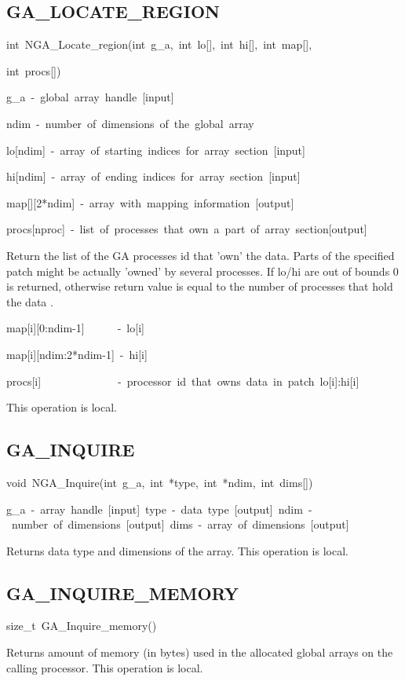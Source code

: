 \subsection*{\label{sub:GA_LOCATE_REGION}GA\_LOCATE\_REGION}
\begin{lyxcode}
int~NGA\_Locate\_region(int~g\_a,~int~lo{[}{]},~int~hi{[}{]},~int~map{[}{]},~

int~procs{[}{]})



g\_a~-~global~array~handle~{[}input{]}~

ndim~-~number~of~dimensions~of~the~global~array

lo{[}ndim{]}~-~array~of~starting~indices~for~array~section~{[}input{]}

hi{[}ndim{]}~-~array~of~ending~indices~for~array~section~{[}input{]}~

map{[}{]}{[}2{*}ndim{]}~-~array~with~mapping~information~{[}output{]}

procs{[}nproc{]}~-~list~of~processes~that~own~a~part~of~array~section{[}output{]}
\end{lyxcode}
Return the list of the GA processes id that 'own' the data. Parts
of the specified patch might be actually 'owned' by several processes.
If lo/hi are out of bounds \textquotedbl{}0\textquotedbl{} is returned,
otherwise return value is equal to the number of processes that hold
the data .
\begin{lyxcode}
map{[}i{]}{[}0:ndim-1{]}~~~~~~-~lo{[}i{]}~

map{[}i{]}{[}ndim:2{*}ndim-1{]}~-~hi{[}i{]}

procs{[}i{]}~~~~~~~~~~~~~~-~processor~id~that~owns~data~in~patch~lo{[}i{]}:hi{[}i{]}
\end{lyxcode}
This operation is local. 


\subsection*{\label{sub:GA_INQUIRE}GA\_INQUIRE}
\begin{lyxcode}
void~NGA\_Inquire(int~g\_a,~int~{*}type,~int~{*}ndim,~int~dims{[}{]})



g\_a~-~array~handle~{[}input{]}~type~-~data~type~{[}output{]}~ndim~-~number~of~dimensions~{[}output{]}~dims~-~array~of~dimensions~{[}output{]}
\end{lyxcode}
Returns data type and dimensions of the array. This operation is local. 


\subsection*{\label{sub:GA_INQUIRE_MEMORY}GA\_INQUIRE\_MEMORY}
\begin{lyxcode}
size\_t~GA\_Inquire\_memory()
\end{lyxcode}
Returns amount of memory (in bytes) used in the allocated global arrays
on the calling processor. This operation is local. 



